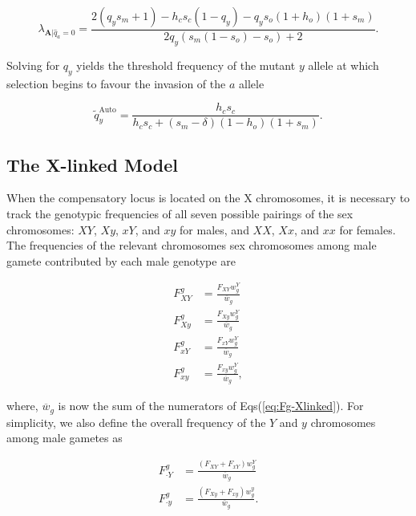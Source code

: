 \documentclass{article}
\begin{document}
\begin{equation} \label{eq:Lambda-a}
	\lambda_{\mathbf{A}|\hat{q}_a = 0} = \frac{2(q_y s_m + 1) - h_c s_c(1 - q_y) - q_y s_o (1 + h_o)(1 + s_m)} {2 q_y (s_m (1 - s_o) - s_o) + 2}.
\end{equation}

\noindent Solving for $q_y$ yields the threshold frequency of the mutant $y$ allele at which selection begins to favour the invasion of the $a$ allele

\begin{equation} \label{eq:aInvDelta-threshold}
	\tilde{q}_y^{\text{Auto}} = \frac{h_c s_c} {h_c s_c + (s_m - \delta)(1 - h_o)(1+s_m)}.
\end{equation}



\newpage{}
\subsection{The X-linked Model}

When the compensatory locus is located on the X chromosomes, it is necessary to track the genotypic frequencies of all seven possible pairings of the sex chromosomes: $XY$, $Xy$, $xY$, and $xy$ for males, and $XX$, $Xx$, and $xx$ for females. The frequencies of the relevant chromosomes sex chromosomes among male gamete contributed by each male genotype are

\begin{subequations}\begin{align} \label{eq:Fg-Xlinked}
	F_{XY}^{g} &= \frac{F_{XY}w^{Y}_{g}}{\overline{w}_g} \\
	F_{Xy}^{g} &= \frac{F_{Xy}w^{Y}_{g}}{\overline{w}_g} \\
	F_{xY}^{g} &= \frac{F_{xY}w^{Y}_{g}}{\overline{w}_g} \\
	F_{xy}^{g} &= \frac{F_{xy}w^{Y}_{g}}{\overline{w}_g}, 
\end{align}\end{subequations}

\noindent where, $\overline{w}_g$ is now the sum of the numerators of Eqs(\ref{eq:Fg-Xlinked}). For simplicity, we also define the overall frequency of the $Y$ and $y$ chromosomes among male gametes as 

 \begin{subequations}\begin{align} \label{eq:qg-Xlinked}
	F_{\cdot Y}^{g} &= \frac{(F_{XY} + F_{xY})w^{Y}_{g}}{\overline{w}_g} \\
	F_{\cdot y}^{g} &= \frac{(F_{Xy} + F_{xy})w^{y}_{g}}{\overline{w}_g}. 
\end{align}\end{subequations}
\end{document}
